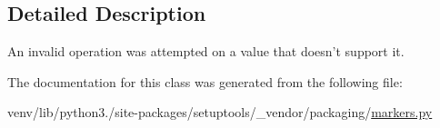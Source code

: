 \subsection{Detailed Description}
\begin{DoxyVerb}An invalid operation was attempted on a value that doesn't support it.
\end{DoxyVerb}
 

The documentation for this class was generated from the following file\+:\begin{DoxyCompactItemize}
\item 
venv/lib/python3./site-\/packages/setuptools/\+\_\+vendor/packaging/\hyperlink{setuptools_2__vendor_2packaging_2markers_8py}{markers.\+py}\end{DoxyCompactItemize}
